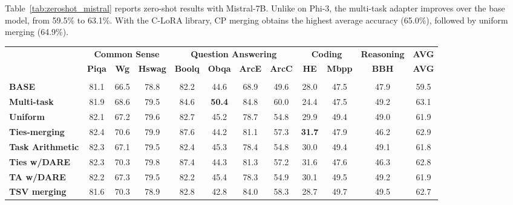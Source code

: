 \documentclass[10pt]{article} %
\begin{document}
Table~\ref{tab:zeroshot_mistral} reports zero-shot results with Mistral-7B. Unlike on Phi-3, the multi-task adapter improves over the base model, from 59.5\% to 63.1\%. With the C-LoRA library, CP merging obtains the highest average accuracy (65.0\%), followed by uniform merging (64.9\%).
\begin{table}[ht]
\small
\centering
\begin{adjustbox}
{width=1.0\textwidth}
\begin{tabular}{l|cccccccccc|c} 
\Xhline{1.6pt}
\multicolumn{1}{c|}{} & \multicolumn{3}{c}{\textbf{Common Sense}} & \multicolumn{4}{c}{\textbf{Question Answering}} & \multicolumn{2}{c}{\textbf{Coding}} & \multicolumn{1}{c}{\textbf{ Reasoning}} & \multicolumn{1}{c}{\textbf{AVG}} \\
\cmidrule(lr){2-4}  \cmidrule(lr){5-8} \cmidrule(lr){9-10}
\cmidrule(lr){11-11}
\multicolumn{1}{c|}{} & \textbf{Piqa} & \textbf{Wg} & \textbf{Hswag} & \textbf{Boolq} & \textbf{Obqa} & \textbf{ArcE} & \textbf{ArcC} & \textbf{HE} & \textbf{Mbpp} & \textbf{BBH} & \multicolumn{1}{c}{\textbf{AVG}} \\
\midrule

\rowcolor{lightgray}\multicolumn{12}{c}{\textbf{Mistral (7B) with LoRA library}  } \\
\textbf{BASE}  & 81.1  & 66.5  & 78.8  & 82.2 & 44.6 & 68.9 & 49.6 & 28.0 & 47.5 & 47.9 & \cellcolor[HTML]{FDE9E8}59.5\\ 
\textbf{Multi-task}  & 81.9 & 68.6 & 79.5 & 84.6 & \textbf{50.4} & 84.8 & 60.0 & 24.4 & 47.5 & 49.2 & \cellcolor[HTML]{FDE9E8}63.1 \\

\textbf{Uniform}& 82.1 & 67.2 & 79.6 & 82.7 & 45.2 & 78.7 & 54.8 & 29.9 & 49.4 & 49.0 &  \cellcolor[HTML]{FDE9E8}61.9 \\

\textbf{Ties-merging} & 82.4 & 70.6 & 79.9 & 87.6 & 44.2 & 81.1 & 57.3 & \textbf{31.7} & 47.9 & 46.2 & \cellcolor[HTML]{FDE9E8}62.9 \\
\textbf{Task Arithmetic} & 82.3 & 67.1 & 79.5 & 82.4 & 45.3 & 78.4 & 54.8 & 30.0 & 49.4 & 49.1 &  \cellcolor[HTML]{FDE9E8}61.8\\
\textbf{Ties w/DARE} & 82.3 & 70.3 & 79.8 & 87.4 & 44.3 & 81.3 & 57.2 & 31.6 & 47.6 & 46.3 & \cellcolor[HTML]{FDE9E8}62.8\\
\textbf{TA w/DARE} & 82.2 & 67.3 & 79.5 & 82.2 & 45.4 & 78.3 & 54.9 & 30.1 & 49.5 & 49.2 & \cellcolor[HTML]{FDE9E8}61.9\\
\textbf{TSV merging} & 81.6 & 70.3 & 78.9 & 82.8 & 42.8 & 84.0 & 58.3 & 28.7 & 49.7 & 49.5 & 62.7\cellcolor[HTML]{FDE9E8}\\


\end{tabular}
\end{adjustbox}
\end{table}
\end{document}
